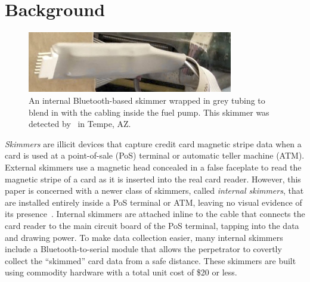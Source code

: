 


%

\section{Background}
\label{sec:background}

\begin{figure}
    \centering
    \includegraphics[width=0.8\textwidth]{skimmer/fig/wrapped-skimmer}
    \captionsetup{justification=centering}
    \caption{An internal Bluetooth-based skimmer wrapped in grey tubing to blend in with the cabling inside the fuel pump. This skimmer
    was detected by \bluetana\ in Tempe, AZ.
}
\label{fig:wrapped-skimmer}
\end{figure}

\emph{Skimmers} are illicit devices that capture credit card magnetic stripe data when a card is used at a point-of-sale (PoS) terminal or automatic teller machine (ATM). External skimmers use a magnetic head concealed in a false
faceplate to read the magnetic stripe of a card as it is inserted into the real card reader. However, this paper is concerned
with a newer class of skimmers, called \emph{internal skimmers}, that are installed entirely inside a PoS
terminal or ATM, leaving no visual evidence of its presence~\cite{skimreaper2018}. Internal skimmers are attached inline to the cable that connects the
card reader to the main circuit board of the PoS terminal, tapping into the data and drawing power.
%
To make data collection easier, many internal skimmers include a Bluetooth-to-serial module that allows the
perpetrator to covertly collect the ``skimmed'' card data from a safe distance.
%
These skimmers are built using commodity hardware with a total unit cost of \$20 or less.

